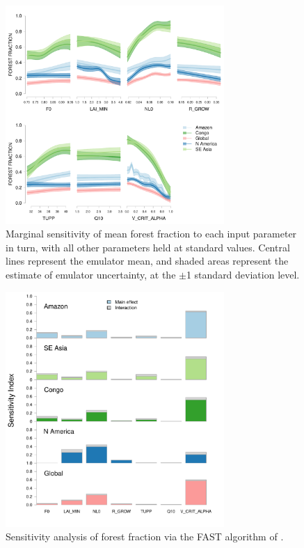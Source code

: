 \documentclass[esd, article]{copernicus} %
\begin{document}
\begin{figure}[t]
\includegraphics[width=8.3cm]{graphics/amaz_oat_sens.pdf}
\caption{Marginal sensitivity of mean forest fraction to each input parameter in turn, with all other parameters held at standard values. Central lines represent the emulator mean, and shaded areas represent the estimate of emulator uncertainty, at the $\pm$1 standard deviation level.}
\label{fig:amaz_oat_sens}
\end{figure}

\begin{figure}[t]
\includegraphics[width=8.3cm]{graphics/FAST_histograms.pdf}
\caption{Sensitivity analysis of forest fraction via the FAST algorithm of \cite{saltelli1999sensitivity}.}
\label{fig:FAST_histograms}
\end{figure}
\end{document}
